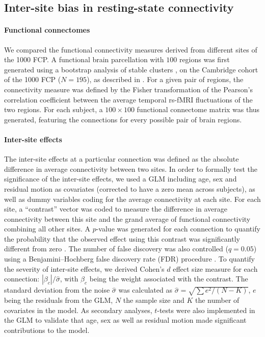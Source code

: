 \documentclass[authoryear]{elsarticle}
\begin{document}
\subsection{Inter-site bias in resting-state connectivity}
\paragraph{Functional connectomes} We compared the functional connectivity measures derived from different sites of the 1000 FCP. A functional brain parcellation with $100$ regions was first generated using a bootstrap analysis of stable clusters \citep{Bellec2010c}, on the Cambridge cohort of the 1000 FCP ($N=195$), as described in \cite{Orban2015}. For a given pair of regions, the connectivity measure was defined by the Fisher transformation of the Pearson's correlation coefficient between the average temporal rs-fMRI fluctuations of the two regions. For each subject, a $100 \times 100$ functional connectome matrix was thus generated, featuring the connections for every possible pair of brain regions. 

\paragraph{Inter-site effects} The inter-site effects at a particular connection was defined as the absolute difference in average connectivity between two sites. In order to formally test the significance of the inter-site effects, we used a GLM including age, sex and residual motion as covariates (corrected to have a zero mean across subjects), as well as dummy variables coding for the average connectivity at each site. For each site, a ``contrast'' vector was coded to measure the difference in average connectivity between this site and the grand average of functional connectivity combining all other sites. A $p$-value was generated for each connection to quantify the probability that the observed effect using this contrast was significantly different from zero \citep{Worsley1995}. The number of false discovery was also controlled ($q=0.05$) using a Benjamini–Hochberg false discovery rate (FDR) procedure \citep{Benjamini1995}.  To quantify the severity of inter-site effects, we derived Cohen's $d$ effect size measure for each connection: $|\beta_c|/\hat{\sigma}$, with $\beta_c$ being the weight associated with the contrast. The standard
deviation from the noise $\hat{\sigma}$ was calculated as $\hat{\sigma}=\sqrt{\sum{e^{2}}/(N-K)}$, $e$ being the residuals from the GLM, $N$
the sample size and $K$ the number of covariates in the model. As secondary analyses, $t$-tests were also implemented in the GLM to validate that age, sex as well as residual motion made significant contributions to the model. 
\end{document}
